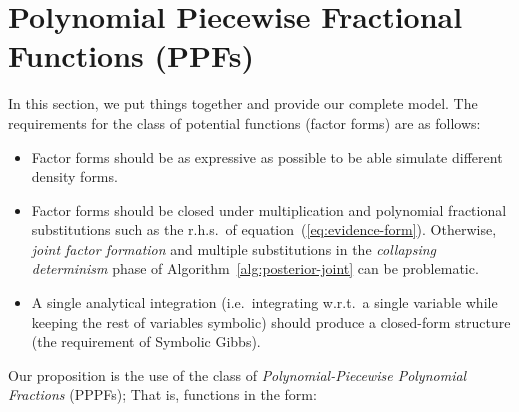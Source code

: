 \documentclass{article}
\begin{document}


\section{Polynomial Piecewise Fractional Functions (PPFs)}
\label{sect:ppfs}
In this section, we put things together and provide our complete model.
The requirements for the class of potential functions (factor forms) are as follows:
\begin{itemize}
\item Factor forms should be as expressive as possible to be able simulate different density forms.  
\item Factor forms should be closed under multiplication and polynomial fractional substitutions such as 
the r.h.s.\ of equation~(\ref{eq:evidence-form}). Otherwise, \emph{joint factor formation} and multiple substitutions in the \emph{collapsing determinism} phase of 
Algorithm~\ref{alg:posterior-joint} can be problematic.
\item A single analytical integration 
(i.e.\ integrating w.r.t.\ a single variable while keeping the rest of variables symbolic) should produce a closed-form structure (the requirement of Symbolic Gibbs).
\end{itemize}   

Our proposition is the use of 
the class of \emph{Polynomial-Piecewise Polynomial Fractions} (PPPFs); That is,   
functions in the form:
\end{document}
